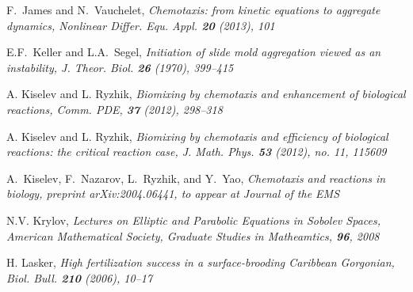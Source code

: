 \documentclass[12pt,reqno]{amsart}
\begin{document}
\begin{thebibliography}{[MT]}

 F.~James and N.~Vauchelet, \it Chemotaxis: from kinetic equations to aggregate dynamics,
\rm Nonlinear Differ. Equ. Appl. {\bf 20} (2013), 101






 E.F.~Keller and L.A.~Segel, \it Initiation of slide mold aggregation
viewed as an instability, \rm J. Theor. Biol. {\bf 26} (1970), 399--415



 A. Kiselev and L. Ryzhik, \it Biomixing by chemotaxis and enhancement of biological reactions, \rm Comm. PDE, {\bf 37} (2012), 298--318

 A. Kiselev and L. Ryzhik, \it Biomixing by chemotaxis and efficiency of biological reactions: the critical reaction case,
\rm J. Math. Phys. {\bf 53} (2012), no. 11, 115609

  A.~Kiselev, F.~Nazarov, L.~Ryzhik, and Y.~Yao, \it Chemotaxis and reactions in biology, \rm preprint arXiv:2004.06441, to appear at Journal of the EMS

 N.V. Krylov, \it Lectures on Elliptic and Parabolic Equations in Sobolev Spaces, \rm American Mathematical Society,
Graduate Studies in Matheamtics, {\bf 96}, 2008

 H. Lasker, \it High fertilization success in a surface-brooding Caribbean Gorgonian, \rm Biol. Bull. {\bf 210} (2006), 10--17


\end{thebibliography}
\end{document}
